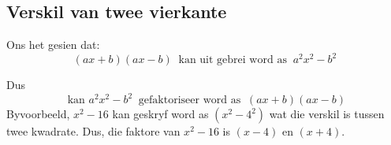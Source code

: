 % 

\subsection* {Verskil van twee vierkante}
Ons het gesien dat: 
\begin{equation*}
(ax+b)(ax-b)~\mbox{ kan uit gebrei word as }~{a}^{2}{x}^{2}-{b}^{2}
\end{equation*}

Dus
\begin{equation*}
\mbox{ kan }{a}^{2}{x}^{2}-{b}^{2}~\mbox{ gefaktoriseer word as }~(ax+b)(ax-b)
\end{equation*}
Byvoorbeeld, ${x}^{2}-16$ kan geskryf word as $({x}^{2}-{4}^{2})$ wat die verskil is tussen twee kwadrate. Dus, die faktore van ${x}^{2}-16$ is $(x-4)$ en $(x+4)$.

